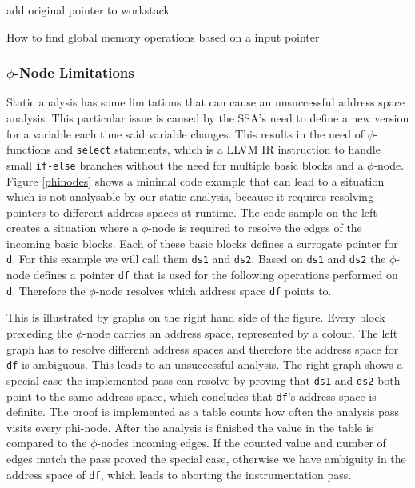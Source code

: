 \begin{algorithm}[t]
add original pointer to workstack\;
\caption{How to find global memory operations based on a input pointer}
\label{anal-algo}
\end{algorithm}
\subsubsection{$\phi$-Node Limitations}\label{patho}
Static analysis has some limitations that can cause an unsuccessful address space analysis. This particular issue is caused by the SSA's need to define a new version for a variable each time said variable changes. This results in the need of $\phi$-functions and \verb|select| statements, which is a LLVM IR instruction to handle small \verb|if-else| branches without the need for multiple basic blocks
and a $\phi$-node. Figure \ref{phinodes} shows a minimal code example that can lead to a situation which is not analysable by our static analysis, because it requires resolving pointers to different address spaces at runtime. The code sample on the left creates a situation where a $\phi$-node is required to resolve the edges of the incoming basic blocks. Each of these basic blocks defines a surrogate pointer for \verb|d|. For this example we will call them \verb|ds1| and \verb|ds2|. Based on \verb|ds1| and \verb|ds2| the $\phi$-node defines a pointer \verb|df| that is used for the following operations performed on \verb|d|. Therefore the $\phi$-node resolves which address space \verb|df| points to. 

This is illustrated by graphs on the right hand side of the figure. Every block preceding the $\phi$-node carries an address space, represented by a colour.
The left graph has to resolve different address spaces and therefore the address space for \verb|df| is ambiguous. This leads to an unsuccessful analysis. The right graph shows a special case the implemented pass can resolve by proving that \verb|ds1| and \verb|ds2| both point to the same address space, which concludes that \verb|df|'s address space is definite. The proof is implemented as a table counts how often the analysis pass visits every phi-node. After the analysis is finished the value in the table is compared to the $\phi$-nodes incoming edges. If the counted value and number of edges match the pass proved the special case, otherwise we have ambiguity in the address space of \verb|df|, which leads to aborting the instrumentation pass.

